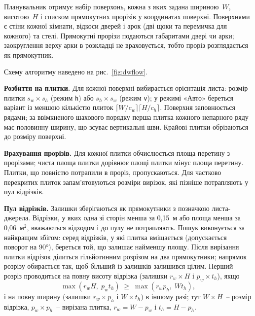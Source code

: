 

Планувальник отримує набір поверхонь, кожна з яких задана шириною~$W$, висотою~$H$ і списком прямокутних прорізів у координатах поверхні. Поверхнями є стіни кожної кімнати, відкоси дверей і арок (дві щоки та перемичка для кожного) та стелі. Прямокутні прорізи подаються габаритами двері чи арки; заокруглення верху арки в розкладці не враховується, тобто проріз розглядається як прямокутник.


Схему алгоритму наведено на рис.~\ref{fig:dwflow}.


\textbf{Розбиття на плитки.} Для кожної поверхні вибирається орієнтація листа: розмір плитки $s_w\times s_h$ (режим \texttt{h}) або $s_h\times s_w$ (режим \texttt{v}); у режимі «Авто» береться варіант із меншою кількістю плиток $\lceil W/c_w\rceil\lceil H/c_h\rceil$. Поверхня заповнюється рядами; за ввімкненого шахового порядку перша плитка кожного непарного ряду має половинну ширину, що зсуває вертикальні шви. Крайові плитки обрізаються до розміру поверхні.

\textbf{Врахування прорізів.} Для кожної плитки обчислюється площа перетину з прорізами; чиста площа плитки дорівнює площі плитки мінус площа перетину. Плитки, що повністю потрапили в проріз, пропускаються. Для частково перекритих плиток запам'ятовуються розміри вирізок, які пізніше потрапляють у пул відрізків.

\textbf{Пул відрізків.} Залишки зберігаються як прямокутники з позначкою листа-джерела. Відрізки, у яких одна зі сторін менша за 0,15~м або площа менша за 0,06~м$^2$, вважаються відходом і до пулу не потрапляють. Пошук виконується за найкращим збігом: серед відрізків, у які плитка вміщається (допускається поворот на 90°), береться той, що залишає найменшу площу. Після вирізання плитки відрізок ділиться гільйотинним розрізом на два прямокутники; напрямок розрізу обирається так, щоб більший із залишків залишився цілим. Перший розріз проводиться на повну висоту відрізка (залишки $r_w\times H$ і $p_w\times t_h$), якщо
\begin{equation}\label{eq:split}
    \max(r_w H,\; p_w t_h) \;\ge\; \max(r_w p_h,\; W t_h),
\end{equation}
і на повну ширину (залишки $r_w\times p_h$ і $W\times t_h$) в іншому разі; тут $W\times H$~-- розмір відрізка, $p_w\times p_h$~-- вирізана плитка, $r_w=W-p_w$ і $t_h=H-p_h$.


